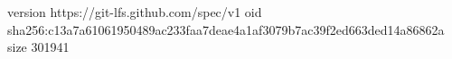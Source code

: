 version https://git-lfs.github.com/spec/v1
oid sha256:c13a7a61061950489ac233faa7deae4a1af3079b7ac39f2ed663ded14a86862a
size 301941
